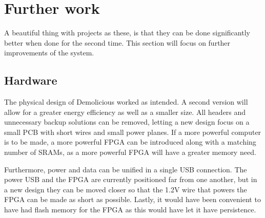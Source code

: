 \documentclass[../main/report.tex]{subfiles}
\begin{document}
\section{Further work}

A beautiful thing with projects as these, is that they can be done significantly better when done for the second time.
This section will focus on further improvements of the system.

\subsection{Hardware}
The physical design of Demolicious worked as intended.
A second version will allow for a greater energy efficiency as well as a smaller size.
All headers and unnecessary backup solutions can be removed, letting a new design focus on a small PCB with short wires and small power planes.
If a more powerful computer is to be made, a more powerful FPGA can be introduced along with a matching number of SRAMs, as a more powerful FPGA will have a greater memory need.

Furthermore, power and data can be unified in a single USB connection.
The power USB and the FPGA are currently positioned far from one another, but in a new design they can be moved closer so that the 1.2V wire that powers the FPGA can be made as short as possible.
Lastly, it would have been convenient to have had flash memory for the FPGA as this would have let it have persistence.  
\end{document}

